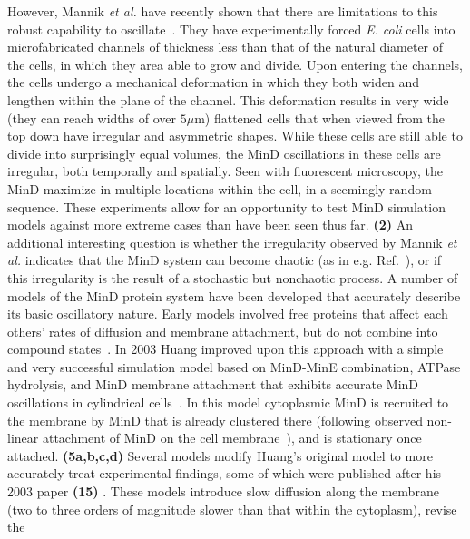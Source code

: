 \documentclass[10pt,letterpaper]{article}
\newcommand\micron{\ensuremath{\mu\text{m}}}
\newcommand{\blue}[1]{{\bf \color{blue} #1}}
\begin{document}
However, Mannik \emph{et al.} have recently shown that there are
limitations to this robust capability to
oscillate~\cite{mannik2012robustness,mannik2009bacterial,mannik2010bacteria}. They
have experimentally forced \emph{E. coli} cells into microfabricated
channels of thickness less than that of the natural diameter of the
cells, in which they area able to grow and divide. Upon entering the
channels, the cells undergo a mechanical deformation in which they
both widen and lengthen within the plane of the channel.  This
deformation results in very wide (they can reach widths of over
$5\micron$) flattened cells that when viewed from the top down have
irregular and asymmetric shapes.  While these cells are still able to
divide into surprisingly equal volumes, the MinD oscillations in these
cells are irregular, both temporally and spatially. Seen with
fluorescent microscopy, the MinD maximize in multiple locations within
the cell, in a seemingly random sequence. These experiments allow for
an opportunity to test MinD simulation models against more extreme
cases than have been seen thus far.  \blue{(2)} An additional
interesting question is whether the irregularity observed by Mannik
\emph{et al.} indicates that the MinD system can become chaotic (as in
e.g. Ref.~), or if this irregularity is
the result of a stochastic but nonchaotic process.
%
A number of models of the MinD protein system have been developed that
accurately describe its basic oscillatory nature.
%
Early models involved free proteins that affect each others' rates of
diffusion and membrane attachment, but do not combine into compound
states~\cite{meinhardt2001pattern}.  In 2003 Huang improved upon this
approach with a simple and very successful simulation model based on
MinD-MinE combination, ATPase hydrolysis, and MinD membrane attachment
that exhibits accurate MinD oscillations in cylindrical
cells~\cite{huang2003dynamic}. In this model cytoplasmic MinD is
recruited to the membrane by MinD that is already clustered there
(following observed non-linear attachment of MinD on the cell
membrane~\cite{hu2002dynamic,shih2002division}), and is stationary
once attached.
%
\blue{(5a,b,c,d)} Several models
\cite{fange2006noise,bonny2013membrane,halatek2012highly} modify
Huang's original model to more accurately treat experimental findings,
some of which were published after his 2003 paper\blue{(15)}
\cite{meacci2006mobility,loose2011min,corbin2002exploring}. These
models introduce slow diffusion along the membrane (two to three
orders of magnitude slower than that within the cytoplasm), revise the
\end{document}
